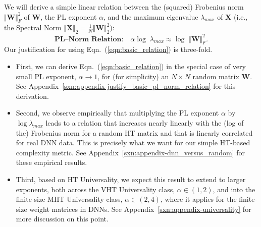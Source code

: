 We will derive a simple linear relation between the (squared) Frobenius norm $\Vert\mathbf{W}\Vert^{2}_{F}$ of $\mathbf{W}$, the PL exponent $\alpha$, and the maximum eigenvalue $\lambda_{max}$ of $\mathbf{X}$ (i.e., the Spectral Norm $\Vert\mathbf{X}\Vert_{2}=\frac{1}{N}\Vert\mathbf{W}\Vert^{2}_{2}$):  
\begin{equation}
\textbf{PL--Norm Relation:} \quad \alpha\log\;\lambda_{max}\approx\log\;\Vert\mathbf{W}\Vert^{2}_{F}  .
\label{eqn:basic_relation}
\end{equation}
Our justification for using Eqn.~(\ref{eqn:basic_relation}) is three-fold.
\begin{itemize}
\item First, we can derive Eqn.~(\ref{eqn:basic_relation}) in the special case of very small PL exponent, $\alpha \rightarrow 1$, for (for simplicity) an $N \times N$ random matrix $\mathbf{W}$.
See Appendix~\ref{sxn:appendix-justify_basic_pl_norm_relation} for this derivation.
\item Second, we observe empirically that multiplying the PL exponent $\alpha$ by $\log\lambda_{max}$ leads to a relation that increases nearly linearly with the (log of the) Frobenius norm for a random HT matrix and that is linearly correlated for real DNN data. 
This is precisely what we want for our simple HT-based complexity metric.
See Appendix~\ref{sxn:appendix-dnn_versus_random} for these empirical results.
\item Third, based on HT Universality, we expect this result to extend to larger exponents, both across the VHT Universality class, $\alpha\in(1,2)$, and into the finite-size MHT Universality class, $\alpha\in(2,4)$, where it applies for the finite-size weight matrices in DNNs.
See Appendix~\ref{sxn:appendix-universality} for more discussion on this point.
\end{itemize}




